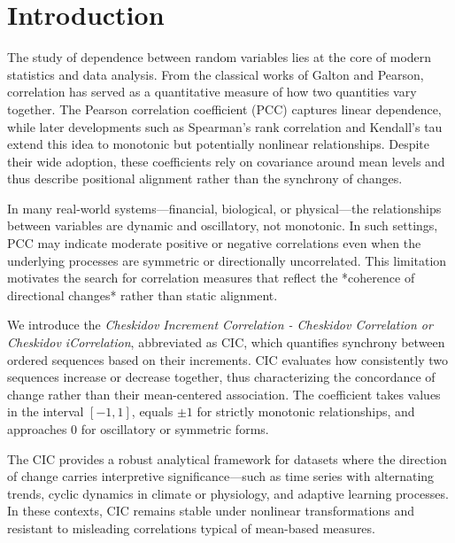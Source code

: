 \documentclass[aos]{imsart}
\newcommand{\cic}{\text{CIC}}
\newcommand{\pcc}{\text{PCC}}
\begin{document}


\section{Introduction}
The study of dependence between random variables lies at the core of modern statistics and data analysis. From the classical works of Galton and Pearson, correlation has served as a quantitative measure of how two quantities vary together. The Pearson correlation coefficient ($\pcc$) captures linear dependence, while later developments such as Spearman’s rank correlation and Kendall’s tau extend this idea to monotonic but potentially nonlinear relationships. Despite their wide adoption, these coefficients rely on covariance around mean levels and thus describe positional alignment rather than the synchrony of changes.

In many real-world systems—financial, biological, or physical—the relationships between variables are dynamic and oscillatory, not monotonic. In such settings, $\pcc$ may indicate moderate positive or negative correlations even when the underlying processes are symmetric or directionally uncorrelated. This limitation motivates the search for correlation measures that reflect the *coherence of directional changes* rather than static alignment.

We introduce the \textit{Cheskidov Increment Correlation - Cheskidov Correlation or Cheskidov iCorrelation}, abbreviated as $\cic$, which quantifies synchrony between ordered sequences based on their increments. $\cic$ evaluates how consistently two sequences increase or decrease together, thus characterizing the concordance of change rather than their mean-centered association. The coefficient takes values in the interval $[-1, 1]$, equals $\pm 1$ for strictly monotonic relationships, and approaches $0$ for oscillatory or symmetric forms.

The $\cic$ provides a robust analytical framework for datasets where the direction of change carries interpretive significance—such as time series with alternating trends, cyclic dynamics in climate or physiology, and adaptive learning processes. In these contexts, $\cic$ remains stable under nonlinear transformations and resistant to misleading correlations typical of mean-based measures.
\end{document}

